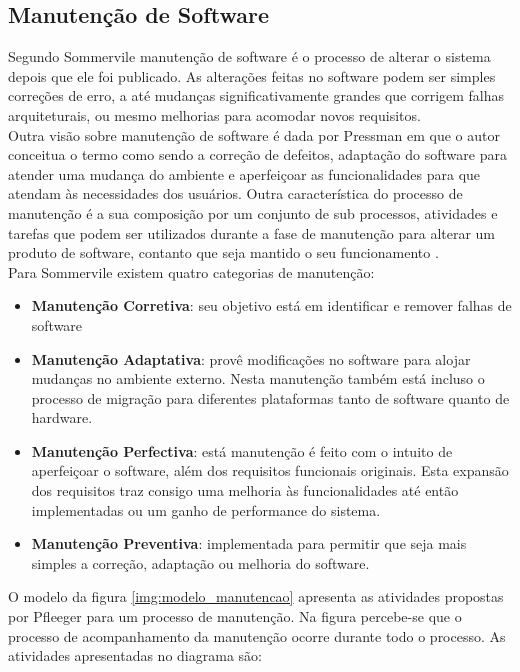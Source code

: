 \subsection{Manutenção de Software}
Segundo Sommervile \cite{sommervile} manutenção de software é o processo de alterar o sistema depois que ele foi publicado. As alterações feitas no software podem ser simples correções de erro, a até mudanças significativamente grandes que corrigem falhas arquiteturais, ou mesmo melhorias para acomodar novos requisitos.
\\Outra visão sobre manutenção de software é dada por Pressman \cite{pressman} em que o autor conceitua o termo como sendo a correção de defeitos, adaptação do software para atender uma mudança do ambiente e aperfeiçoar as funcionalidades para que atendam às necessidades dos usuários. Outra característica do processo de manutenção é a sua composição por um conjunto de sub processos, atividades e tarefas que podem ser utilizados durante a fase de manutenção para alterar um produto de software, contanto que seja mantido o seu funcionamento \cite{calazans_avaliacao_2005}.
\\Para Sommervile existem quatro categorias de manutenção:
\begin{itemize}
\item \textbf{Manutenção Corretiva}: seu objetivo está em identificar e remover falhas de software
\item \textbf{Manutenção Adaptativa}: provê modificações no software para alojar mudanças no ambiente externo. Nesta manutenção também está incluso o processo de migração para diferentes plataformas tanto de software quanto de hardware.
\item \textbf{Manutenção Perfectiva}: está manutenção é feito com o intuito de aperfeiçoar o software, além dos requisitos funcionais originais. Esta expansão dos requisitos traz consigo uma melhoria às funcionalidades até então implementadas ou um ganho de performance do sistema.
\item \textbf{Manutenção Preventiva}: implementada para permitir que seja mais simples a correção, adaptação ou melhoria do software.
\end{itemize}

O modelo da figura \ref{img:modelo_manutencao} apresenta as atividades propostas por Pfleeger para um processo de manutenção. Na figura percebe-se que o processo de acompanhamento da manutenção ocorre durante todo o processo. As atividades apresentadas no diagrama são:

